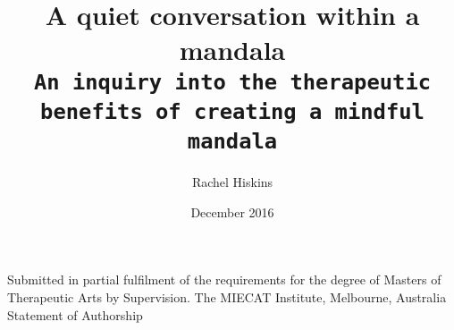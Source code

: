 \documentclass{book}
\author{Rachel Hiskins}
\title{{\Huge A quiet conversation within a mandala}\\[15pt]
\space
\texttt{An inquiry into the therapeutic \\benefits of creating a mindful mandala}}
\date {December 2016}
\begin{document}
\begin{titlepage}
	\calligra
    \maketitle
\end{titlepage}
\doublespacing 

\begin{description}
\item[ Submitted in partial fulfilment of the requirements for the degree of Masters of Therapeutic Arts by Supervision. The MIECAT Institute, Melbourne, Australia
Statement of Authorship] 
\end{description}

	




\end{document}
